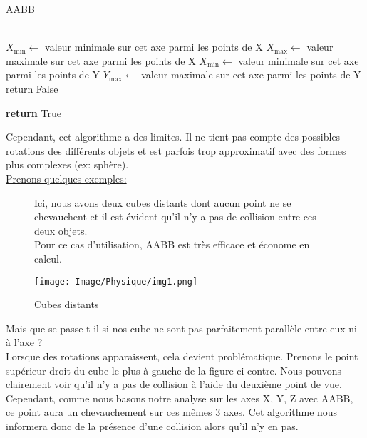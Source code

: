\begin{algorithm}[H]
	\caption{AABB}
	\label{Algorithme AABB}
	\begin{algorithmic}[1]
		\\
		\State $X_{\text{min}} \gets$ valeur minimale sur cet axe parmi les points de X
		\State $X_{\text{max}} \gets$ valeur maximale sur cet axe parmi les points de X
		\State $X_{\text{min}} \gets$ valeur minimale sur cet axe parmi les points de Y
		\State $Y_{\text{max}} \gets$ valeur maximale sur cet axe parmi les points de Y
		\State	return False
		\EndIf
		\EndFor
	
		\State \textbf{return} True
	\end{algorithmic}
\end{algorithm}

\noindent Cependant, cet algorithme a des limites. Il ne tient pas compte des possibles rotations des différents objets et est parfois trop approximatif avec des formes plus complexes (ex: sphère).\\

\noindent\underline{Prenons quelques exemples:}
\begin{figure}[h!]
	\begin{minipage}[t!]{0.6\linewidth}
		Ici, nous avons deux cubes distants dont aucun point ne se chevauchent et il est évident qu'il n'y a pas de collision entre ces deux objets.\\
		Pour ce cas d'utilisation, AABB est très efficace et économe en calcul.
	\end{minipage}
	\hfill 
	\begin{minipage}[t!]{0.35\linewidth} 
		\centering
		\texttt{[image: Image/Physique/img1.png]}
		\caption{Cubes distants}
		\label{fig:Cubes_distant}
	\end{minipage}
\end{figure}

\noindent Mais que se passe-t-il si nos cube ne sont pas parfaitement parallèle entre eux ni à l'axe ?\\

\noindent Lorsque des rotations apparaissent, cela devient problématique. Prenons le point supérieur droit du cube le plus à gauche de la figure ci-contre. Nous pouvons clairement voir qu'il n'y a pas de collision à l'aide du deuxième point de vue. Cependant, comme nous basons notre analyse sur les axes X, Y, Z avec AABB, ce point aura un chevauchement sur ces mêmes 3 axes. Cet algorithme nous informera donc de la présence d'une collision alors qu'il n'y en pas.

